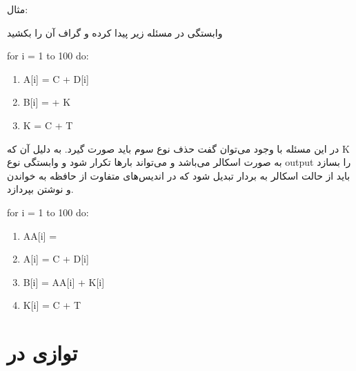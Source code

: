 \documentclass[20pt, a4paper]{article}
\begin{document}

مثال:

وابستگی در مسئله زیر پیدا کرده و گراف آن را بکشید

\begin{LTR}
    for i = 1 to 100 do:
    \begin{enumerate}
        \item A[i] = C + D[i]
        \item B[i] =  + K
        \item K = C + T
    \end{enumerate}
\end{LTR}

در این مسئله با وجود  می‌توان گفت حذف نوع سوم باید صورت گیرد. به
دلیل آن که K به صورت اسکالر می‌باشد و می‌تواند بار‌ها تکرار شود و وابستگی نوع
output را بسازد باید از حالت اسکالر به بردار تبدیل شود که در اندیس‌های متفاوت از
حافظه به خواندن و نوشتن بپردازد.


\begin{LTR}
    for i = 1 to 100 do:
    \begin{enumerate}
        \item AA[i] = 
        \item A[i] = C + D[i]
        \item B[i] = AA[i] + K[i]
        \item K[i] = C + T
    \end{enumerate}
\end{LTR}


\section{توازی در }
\end{document}

